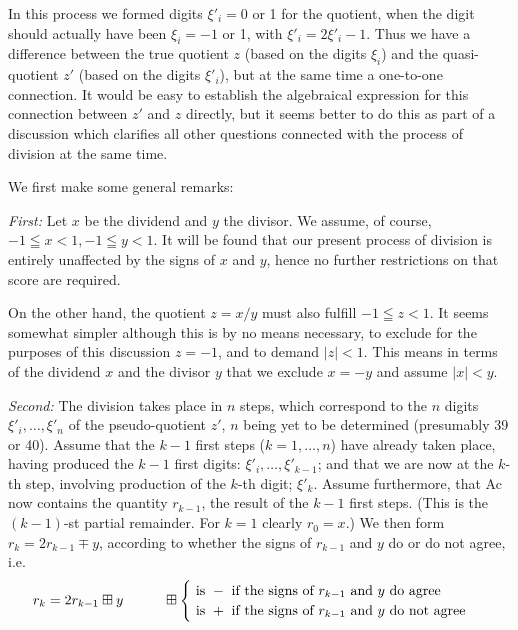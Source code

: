 \documentclass[12pt]{amsart}
\begin{document}
In this process we formed digits $\xi'_i = 0$ or 1 for the quotient, when the digit should actually have been $\xi_i = -1$ or 1, with $\xi'_i = 2\xi'_i - 1$. Thus we have a difference between the true quotient $z$ (based on the digits $\xi_i$) and the quasi-quotient $z'$ (based on the digits $\xi'_i$), but at the same time a one-to-one connection. It would be easy to establish the algebraical expression for this connection between $z'$ and $z$ directly, but it seems better to do this as part of a discussion which clarifies all other questions connected with the process of division at the same time.

We first make some general remarks:

\emph{First:} Let $x$ be the dividend and $y$ the divisor. We assume, of course, $-1 \leqq x < 1, -1 \leqq y < 1$. It will be found that our present process of division is entirely unaffected by the signs of $x$ and $y$, hence no further restrictions on that score are required.

On the other hand, the quotient $z = x/y$ must also fulfill $-1 \leqq z < 1$. It seems somewhat simpler although this is by no means necessary, to exclude for the purposes of this discussion $z = -1$, and to demand $|z| < 1$. This means in terms of the dividend $x$ and the divisor $y$ that we exclude $x = -y$ and assume $|x| < y$.

\emph{Second:} The division takes place in $n$ steps, which correspond to the $n$ digits $\xi'_i, \dots, \xi'_n$ of the pseudo-quotient $z'$, $n$ being yet to be determined (presumably 39 or 40). Assume that the $k - 1$ first steps ($k = 1, \dots, n$) have already taken place, having produced the $k - 1$ first digits: $\xi'_i, \dots, \xi'_{k-1}$; and that we are now at the $k$-th step, involving production of the $k$-th digit; $\xi'_k$. Assume furthermore, that Ac now contains the quantity $r_{k-1}$, the result of the $k - 1$ first steps. (This is the $(k - 1)$-st partial remainder. For $k = 1$ clearly $r_0 = x$.) We then form $r_k = 2r_{k - 1} \mp y$, according to whether the signs of $r_{k-1}$ and $y$ do or do not agree, i.e.
\[
r_k = 2r_{k-1} \boxplus y \hspace{10 mm}
\boxplus
\begin{cases}
\text{ is } - \text{ if the signs of } r_{k-1} \text{ and } y \text{ do agree } \\
\text{ is } + \text{ if the signs of } r_{k-1} \text{ and } y \text{ do not agree }
\end{cases}
\]
\end{document}

